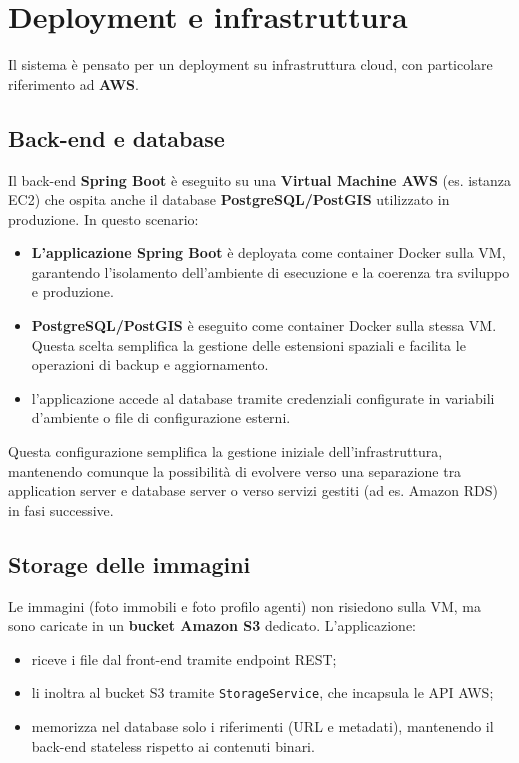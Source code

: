 \documentclass[a4paper,11pt]{report}
\begin{document}
\pagebreak

\section{Deployment e infrastruttura}

Il sistema è pensato per un deployment su infrastruttura cloud, con particolare riferimento ad \textbf{AWS}.

\subsection{Back-end e database}

Il back-end \textbf{Spring Boot} è eseguito su una \textbf{Virtual Machine AWS} (es. istanza EC2) che ospita anche il database \textbf{PostgreSQL/PostGIS} utilizzato in produzione. In questo scenario:

\begin{itemize}[nosep]
  \item \textbf{L'applicazione Spring Boot} è deployata come container Docker sulla VM, garantendo l'isolamento dell'ambiente di esecuzione e la coerenza tra sviluppo e produzione.
  \item \textbf{PostgreSQL/PostGIS} è eseguito come container Docker sulla stessa VM. Questa scelta semplifica la gestione delle estensioni spaziali e facilita le operazioni di backup e aggiornamento.
  \item l'applicazione accede al database tramite credenziali configurate in variabili d'ambiente o file di configurazione esterni.
\end{itemize}

Questa configurazione semplifica la gestione iniziale dell'infrastruttura, mantenendo comunque la possibilità di evolvere verso una separazione tra application server e database server o verso servizi gestiti (ad es. Amazon RDS) in fasi successive.

\subsection{Storage delle immagini}

Le immagini (foto immobili e foto profilo agenti) non risiedono sulla VM, ma sono caricate in un \textbf{bucket Amazon S3} dedicato. L'applicazione:

\begin{itemize}[nosep]
  \item riceve i file dal front-end tramite endpoint REST;
  \item li inoltra al bucket S3 tramite \texttt{StorageService}, che incapsula le API AWS;
  \item memorizza nel database solo i riferimenti (URL e metadati), mantenendo il back-end stateless rispetto ai contenuti binari.
\end{itemize}
\end{document}
